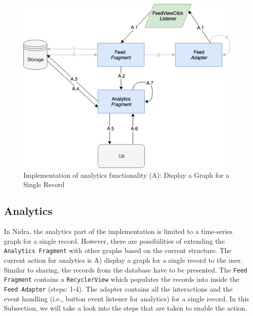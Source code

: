






\begin{figure}
    \centering
    \includegraphics[scale=0.6]{images/Anal_Imp.png}
    \caption{Implementation of analytics functionality (A): Display a Graph for a Single Record}
    \label{fig:impl_analytics}
\end{figure}

\subsection{Analytics}
In Nidra, the analytics part of the implementation is limited to a time-series graph for a single record. However, there are possibilities of extending the \verb|Analytics Fragment| with other graphs based on the current structure. The current action for analytics is A) display a graph for a single record to the user. Similar to sharing, the records from the database have to be presented. The \verb|Feed Fragment| contains a \verb|RecyclerView| which populates the records into inside the \verb|Feed Adapter| (steps: 1-4). The adapter contains all the interactions and the event handling (i.e., button event listener for analytics) for a single record. In this Subsection, we will take a look into the steps that are taken to enable the action.

